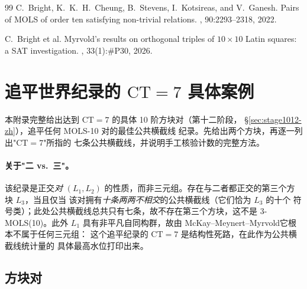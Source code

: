 \documentclass[11pt,a4paper]{ctexart}
\theoremstyle{remark}
\newcommand{\CT}{\mathrm{CT}}
\begin{document}
\begin{thebibliography}{99}
C.~Bright, K.~K.~H.~Cheung, B.~Stevens, I.~Kotsireas, and V.~Ganesh.
\newblock Pairs of MOLS of order ten satisfying non-trivial relations.
, 90:2293--2318, 2022.

C.~Bright et al.
\newblock Myrvold's results on orthogonal triples of $10 \times 10$ Latin
squares: a SAT investigation.
, 33(1):\#P30, 2026.

\end{thebibliography}

\appendix
\newpage
\section{追平世界纪录的 $\CT=7$ 具体案例}
\label{app:ct7-zh}

本附录完整给出达到 $\CT=7$ 的具体 10 阶方块对（第十二阶段，
\S\ref{sec:stage1012-zh}），追平任何 MOLS-10 对的最佳公共横截线
纪录\cite{bright2022}。先给出两个方块，再逐一列出"$\CT=7$"所指的
七条公共横截线，并说明手工核验计数的完整方法。

\paragraph{关于"二 vs.\ 三"。} 该纪录是正交\emph{对} $(L_1,L_2)$
的性质，而非三元组。存在与二者都正交的第三个方块 $L_3$，当且仅当
该对拥有\emph{十条两两不相交}的公共横截线（它们恰为 $L_3$ 的十个
符号类）；此处公共横截线总共只有七条，故不存在第三个方块，这不是
3-MOLS(10)。此外 $L_1$ 具有非平凡自同构群，故由
McKay--Meynert--Myrvold\cite{mmm2007}它根本不属于任何三元组：
这个追平纪录的 $\CT=7$ 是结构性死路，在此作为公共横截线统计量的
具体最高水位打印出来。

\subsection*{方块对}
\end{document}
